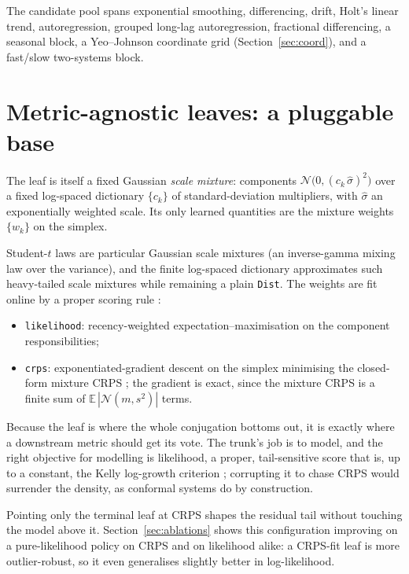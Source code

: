 \documentclass[article]{jss}
\providecommand{\code}[1]{\texttt{#1}}
\begin{document}
The candidate pool spans exponential smoothing, differencing, drift, Holt's
linear trend, autoregression, grouped long-lag autoregression, fractional
differencing, a seasonal block, a Yeo--Johnson coordinate grid
(Section~\ref{sec:coord}), and a fast/slow two-systems block.

\section{Metric-agnostic leaves: a pluggable base} \label{sec:leaf}

The leaf is itself a fixed Gaussian \emph{scale mixture}: components
$\mathcal N\!\big(0, (c_k\,\hat\sigma)^2\big)$ over a fixed log-spaced
dictionary $\{c_k\}$ of standard-deviation multipliers, with $\hat\sigma$ an
exponentially weighted scale. Its only learned quantities are the mixture
weights $\{w_k\}$ on the simplex.

Student-$t$ laws are particular Gaussian
scale mixtures (an inverse-gamma mixing law over the variance), and the finite
log-spaced dictionary approximates such heavy-tailed scale mixtures while
remaining a plain \code{Dist}. The weights are fit online by
a proper scoring rule \citep{gneiting2007strictly}:
\begin{itemize}
\item \code{likelihood}: recency-weighted expectation--maximisation on the
  component responsibilities;
\item \code{crps}: exponentiated-gradient descent on the simplex minimising the
  closed-form mixture CRPS \citep{matheson1976scoring}; the gradient is exact,
  since the mixture CRPS is a finite sum of $\mathbb E\,|\mathcal N(m,s^2)|$ terms.
\end{itemize}

Because the leaf is where the whole conjugation bottoms out, it is exactly where a
downstream metric should get its vote. The trunk's job is to model, and the right
objective for modelling is likelihood, a proper, tail-sensitive score that is,
up to a constant, the Kelly log-growth criterion \citep{kelly1956new}; corrupting
it to chase CRPS would surrender the density, as conformal systems do by
construction.

Pointing only the terminal leaf at CRPS shapes the residual tail without touching
the model above it. Section~\ref{sec:ablations} shows this configuration
improving on a pure-likelihood policy on CRPS and on likelihood alike: a CRPS-fit
leaf is more outlier-robust, so it even generalises slightly better in
log-likelihood.
\end{document}

